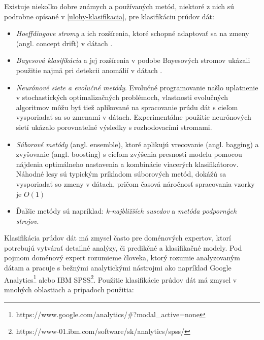 Existuje niekoľko dobre známych a používaných metód, niektoré z nich sú podrobne opísané v \ref{ulohy-klasifikacia}, pre klasifikáciu prúdov dát:
\begin{itemize}
	\item \textit{Hoeffdingove stromy} a ich rozšírenia, ktoré schopné adaptovať sa na zmeny (angl. concept drift) v dátach \citep{hulten2001mining, bifet2009adaptive}.
	\item \textit{Bayesová klasifikácia} a jej rozšírenia v podobe Bayesových stromov ukázali použitie najmä pri detekcii anomálií v dátach \citep{hill2007real}.
	\item \textit{Neurónové siete a evolučné metódy}. Evolučné programovanie našlo uplatnenie v stochastických optimalizačných problémoch, vlastnosti evolučných algoritmov môžu byť tiež aplikované na spracovanie prúdu dát s cieľom vysporiadať sa so zmenami v dátach. Experimentálne použitie neurónových sietí ukázalo porovnateľné výsledky s rozhodovacími stromami.
	\item \textit{Súborové metódy} (angl. ensemble), ktoré aplikujú vrecovanie (angl. bagging) a zvyšovanie (angl. boosting) s cieľom zvýšenia presnosti modelu pomocou nájdenia optimálneho nastavenia a kombinácie viacerých klasifikátorov. Náhodné lesy sú typickým príkladom súborových metód, dokážú sa vysporiadať so zmeny v dátach, pričom časová náročnosť spracovania vzorky je $O(1)$ %
	\item Ďalšie metódy sú napríklad: \textit{k-najbližších susedov} a \textit{metóda podporných strojov}.
\end{itemize}

Klasifikácia prúdov dát má zmysel často pre doménových expertov, ktorí potrebujú vytvárať detailné analýzy, či predikčné a klasifikačné modely. Pod pojmom doménový expert rozumieme človeka, ktorý rozumie analyzovaným dátam a pracuje s bežnými analytickými nástrojmi ako napríklad Google Analytics\footnote{https://www.google.com/analytics/#?modal_active=none} alebo IBM SPSS\footnote{https://www-01.ibm.com/software/sk/analytics/spss/}. Použitie klasifikácie prúdov dát má zmysel v mnohých oblastiach a prípadoch použitia:

